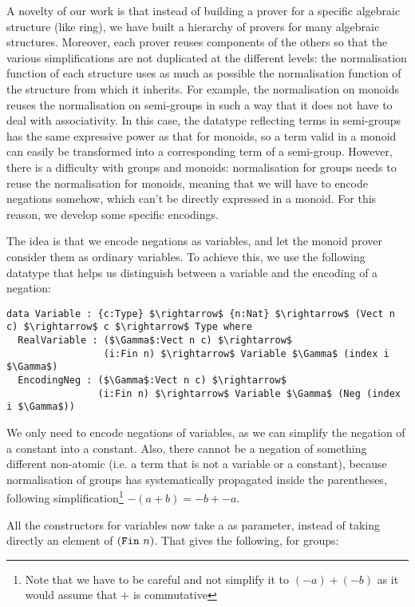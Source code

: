 A novelty of our work is that instead of building a prover for a
specific algebraic structure (like ring), we have built a hierarchy of provers
for many algebraic structures. Moreover, each prover reuses components
of the others so that
the various simplifications are not duplicated at the different
levels: the normalisation function of each structure uses as much as possible
the normalisation function of the structure from which it inherits. For
example, the normalisation on monoids reuses the normalisation on semi-groups
in such a way that it does not have to deal with associativity. In this
case, the datatype reflecting terms in semi-groups has
the same expressive power as that for monoids, so a term valid in a monoid can easily be transformed into a corresponding term of a semi-group. However, 
there is a difficulty with
groups and monoids: normalisation for groups
needs to reuse the normalisation for monoids, meaning that
we will have to encode 
negations somehow, which can't be directly expressed in a monoid. For this
reason, we develop some specific encodings.

The idea is that we encode negations as variables, and let the
monoid prover consider them as ordinary variables. To achieve this,
we use the following datatype that helps us distinguish between a
variable and the encoding of a negation:

\begin{lstlisting}
data Variable : {c:Type} $\rightarrow$ {n:Nat} $\rightarrow$ (Vect n c) $\rightarrow$ c $\rightarrow$ Type where
  RealVariable : ($\Gamma$:Vect n c) $\rightarrow$ 
                 (i:Fin n) $\rightarrow$ Variable $\Gamma$ (index i $\Gamma$)
  EncodingNeg : ($\Gamma$:Vect n c) $\rightarrow$ 
                (i:Fin n) $\rightarrow$ Variable $\Gamma$ (Neg (index i $\Gamma$))
\end{lstlisting}

We only need to encode negations of variables, as we can simplify 
the negation of a constant into a constant.
Also, there cannot be a negation of something
different non-atomic (i.e. a term that is not a variable or a constant), because normalisation 
of
groups has systematically propagated  inside the parentheses,
following simplification\footnote{Note that we have to be careful and not
simplify it to $(-a) + (-b)$ as it would assume that $+$ is commutative}
$-(a+b) = -b + -a$.

All the constructors for variables now take a  as parameter,
instead of taking directly an element of $(\code{Fin}\ n)$. That gives the
following, for groups:

